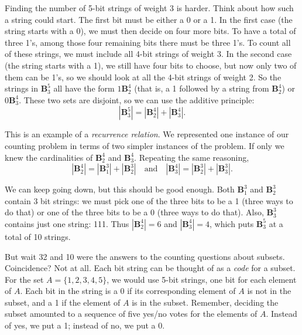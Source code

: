 \documentclass[10pt,]{book}
\theoremstyle{plain}
\theoremstyle{definition}
\theoremstyle{definition}
\theoremstyle{definition}
\numberwithin{equation}{chapter}
\def\B{\mathbf{B}}
\begin{document}
        Finding the number of 5-bit strings of weight 3 is harder. Think about how such a string could start. The first bit must be either a 0 or a 1. In the first case (the string starts with a 0), we must then decide on four more bits. To have a total of three 1's, among those four remaining bits there must be three 1's. To count all of these strings, we must include all 4-bit strings of weight 3. In the second case (the string starts with a 1), we still have four bits to choose, but now only two of them can be 1's, so we should look at all the 4-bit strings of weight 2. So the strings in \(\B^5_3\) all have the form \(1\B^4_2\) (that is, a 1 followed by a string from \(\B^4_2\)) or \(0\B^4_3\). These two sets are disjoint, so we can use the additive principle:
        \begin{equation*}
          |\B^5_3| = |\B^4_2| + |\B^4_3|.
        \end{equation*}
\par

        This is an example of a \emph{recurrence relation}. We represented one instance of our counting problem in terms of two simpler instances of the problem. If only we knew the cardinalities of \(\B^4_2\) and \(\B^4_3\). Repeating the same reasoning,
        \begin{equation*}
          |\B^4_2| = |\B^3_1| + |\B^3_2| \quad \mbox{and} \quad |\B^4_3| = |\B^3_2| + |\B^3_3|.
        \end{equation*}
\par

        We can keep going down, but this should be good enough. Both \(\B^3_1\) and \(\B^3_2\) contain 3 bit strings: we must pick one of the three bits to be a 1 (three ways to do that) or one of the three bits to be a 0 (three ways to do that). Also, \(\B^3_3\) contains just one string: 111. Thus \(|\B^4_2| = 6\) and \(|\B^4_3| = 4\), which puts \(\B^5_3\) at a total of 10 strings.
\par

        But wait
        \textemdash{}32 and 10 were the answers to the counting questions about subsets. Coincidence? Not at all. Each bit string can be thought of as a \emph{code} for a subset. For the set \(A = \{1,2,3,4,5\}\), we would use 5-bit strings, one bit for each element of \(A\). Each bit in the string is a 0 if its corresponding element of \(A\) is not in the subset, and a 1 if the element of \(A\) is in the subset. Remember, deciding the subset amounted to a sequence of five yes/no votes for the elements of \(A\). Instead of yes, we put a 1; instead of no, we put a 0.
\par
\end{document}
